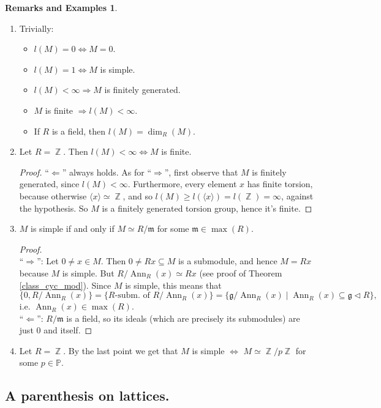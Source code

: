 \documentclass[12pt,a4paper]{report}
\theoremstyle{definition}
\newtheorem*{remex}{Remarks and Examples}
\theoremstyle{num.custom-title}
\DeclareMathOperator{\Ann}{Ann}
\DeclareMathOperator{\Z}{\mathbb{Z}}
\DeclareMathOperator{\imp}{\Rightarrow}
\DeclareMathOperator{\pmi}{\Leftarrow}
\DeclareMathOperator{\sse}{\subseteq}
\newcommand{\g}{\mathfrak{g}}
\newcommand{\m}{\mathfrak{m}}
\renewcommand{\P}{\mathbb{P}}
\renewcommand{\iff}{\Leftrightarrow}
\begin{document}
\begin{remex}\ 
\begin{enumerate}
\item Trivially:
\begin{itemize}
\item $l(M)=0 \iff M=0$.
\item $l(M)=1 \iff M$ is simple.
\item $l(M) < \infty \imp M$ is finitely generated.
\item $M$ is finite $\imp l(M)<\infty$.
\item If $R$ is a field, then $l(M)=\dim_R(M)$.
\end{itemize}
\item Let $R=\Z$. Then $l(M)<\infty \iff M$ is finite.
\begin{proof}
``$\pmi$'' always holds. As for ``$\imp$'', first observe that $M$ is finitely generated, since $l(M)<\infty$. Furthermore, every element $x$ has finite torsion, because otherwise $\langle x \rangle \simeq \Z$, and so $l(M) \geq l(\langle x \rangle) = l(\Z) = \infty$, against the hypothesis. So $M$ is a finitely generated torsion group, hence it's finite.
\end{proof}
\item $M$ is simple if and only if $M \simeq R/\m$ for some $\m \in \max(R)$.
\begin{proof}\ \\
``$\imp$'': Let $0 \neq x \in M$. Then $0 \neq Rx \sse M$ is a submodule, and hence $M=Rx$ because $M$ is simple. But $R/\Ann_R(x) \simeq Rx$ (see proof of Theorem \ref{class_cyc_mod}). Since $M$ is simple, this means that 
\[
\{0,R/\Ann_R(x)\} = \{R\text{-subm. of } R/\Ann_R(x)\} = \{\g/\Ann_R(x) \mid \Ann_R(x) \sse \g \lhd R\},
\]
i.e. $\Ann_R(x) \in \max(R)$.
\\[6pt]
``$\pmi$'': $R/\m$ is a field, so its ideals (which are precisely its submodules) are just $0$ and itself.
\end{proof}
\item Let $R=\Z$. By the last point we get that $M$ is simple $\iff$ $M \simeq \Z/p\Z$ for some $p \in \P$.
\end{enumerate}
\end{remex}

\subsection{A parenthesis on lattices.}
\end{document}
